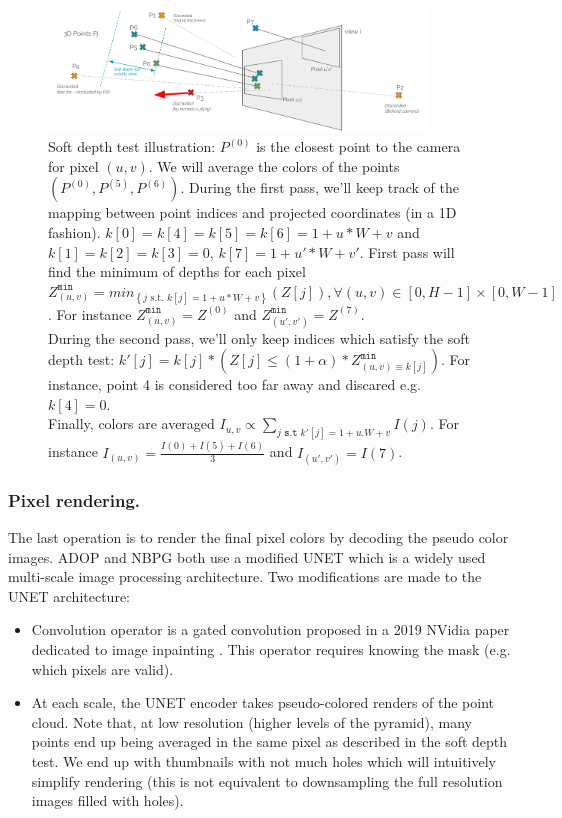 \begin{figure}[h]
    \centering
    \includegraphics[width=0.9\textwidth]{figures/soft_depth_test_two_pixels.png}
    \caption{Soft depth test illustration: 
    $P^{(0)}$ is the closest point to the camera for pixel $(u,v)$. We will average the colors of the points $(P^{(0)}, P^{(5)}, P^{(6)})$. During the first pass, we'll keep track of the mapping between point indices and projected coordinates (in a 1D fashion). $k[0]=k[4]=k[5]=k[6]=1+u*W+v$ and $k[1]=k[2]=k[3]=0$, $k[7] = 1+u'*W+v'$. First pass will find the minimum of depths for each pixel $Z^{\texttt{min}}_{(u,v)} = min_{\left\{j  \text{ s.t. } k[j]=1+u*W+v\right\}} \left(Z[j]\right), \forall (u,v) \in \left[0, H-1\right] \times \left[0, W-1\right]$. For instance $Z^{\texttt{min}}_{(u,v)} = Z^{(0)}$ and $Z^{\texttt{min}}_{(u',v')} = Z^{(7)}$. \\ During the second pass, we'll only keep indices which satisfy the soft depth test: $ k'[j] = k[j] * \left(Z[j] \leq (1+\alpha) *Z^{\texttt{min}}_{(u,v) \equiv k[j]}\right)$.
   For instance, point 4 is considered too far away and discared e.g. $k[4]=0$. \\Finally, colors are averaged $I_{u, v} \propto \sum_{j \texttt{ s.t  } k'[j]=1+u.W+v}{I(j)}$. For instance $I_{(u, v)} = \frac{I(0) + I(5) + I(6)}{3}$ and $I_{(u', v')} = I(7)$.}
    \label{fig:soft_depth_test}
\end{figure}


\subsubsection{Pixel rendering.}
\label{sec:pixel rendering}
The last operation is to render the final pixel colors by decoding the pseudo color images.
ADOP \cite{ruckert2022adop} and NBPG \cite{Aliev2020} both use a modified UNET \cite{ronneberger2015unet} which is a widely used multi-scale image processing architecture. Two modifications are made to the UNET architecture:
\begin{itemize}
    \item Convolution operator is a gated convolution proposed in a 2019 NVidia paper dedicated to image inpainting \cite{yu2019freeform}. This operator requires knowing the mask (e.g. which pixels are valid).
    \item At each scale, the UNET encoder takes pseudo-colored renders of the point cloud. Note that, at low resolution (higher levels of the pyramid), many points end up being averaged in the same pixel as described in the soft depth test. We end up with thumbnails with not much holes which will intuitively simplify rendering (this is not equivalent to downsampling the full resolution images filled with holes). 
\end{itemize}
